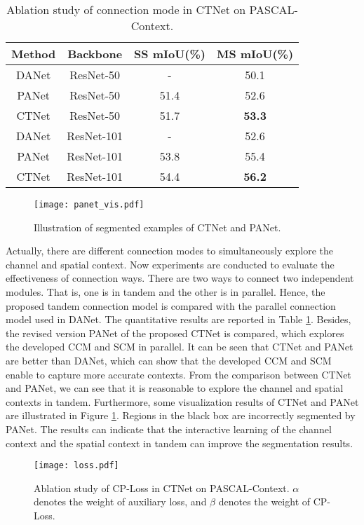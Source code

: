 \documentclass[10pt,journal,cspaper,compsoc]{IEEEtran}
\begin{document}
\begin{table}[t]
\caption{Ablation study of connection mode in CTNet on PASCAL-Context.}
	\label{table6}
		\renewcommand\arraystretch{1.3}
		\centering
		\begin{tabular}{c|c|c|c}
			\hline
			Method &Backbone&SS mIoU(\%) &MS mIoU(\%)\\
			\hline
			DANet \cite{fu2019dual}&ResNet-50&-&50.1\\
			PANet & ResNet-50& 51.4&52.6\\
			CTNet& ResNet-50&51.7&\textbf{53.3}\\
			\hline
			DANet \cite{fu2019dual} &ResNet-101 &-&52.6\\
			PANet & ResNet-101 &53.8&55.4\\
			CTNet& ResNet-101&54.4&\textbf{56.2}\\
			\hline
	\end{tabular}
\end{table}

\begin{figure}
		\centering
		\texttt{[image: panet\_vis.pdf]}
		\caption{Illustration of segmented examples of CTNet and PANet.}
		\label{fig10}
\vspace{-4mm}
\end{figure}

Actually, there are different connection modes to simultaneously explore the channel and spatial context. Now experiments are conducted to evaluate the effectiveness of connection ways. There are two ways to connect two independent modules. That is, one is in tandem and the other is in parallel. Hence, the proposed tandem connection model is compared with the parallel connection model used in DANet. The quantitative results are reported in Table \ref{table6}. Besides, the revised version PANet of the proposed CTNet is compared, which explores the developed CCM and SCM in parallel. It can be seen that CTNet and PANet are better than DANet, which can show that the developed CCM and SCM enable to capture more accurate contexts. From the comparison between CTNet and PANet, we can see that it is reasonable to explore the channel and spatial contexts in tandem. Furthermore, some visualization results of CTNet and PANet are illustrated in Figure \ref{fig10}. Regions in the black box are incorrectly segmented by PANet. The results can indicate that the interactive learning of the channel context and the spatial context in tandem can improve the segmentation results.

\begin{figure}
		\centering
		\texttt{[image: loss.pdf]}
		\caption{Ablation study of CP-Loss in CTNet on PASCAL-Context. $\alpha$ denotes the weight of auxiliary loss, and $\beta$ denotes the weight of CP-Loss.}
		\label{fig11}
\end{figure}
	
\end{document}
